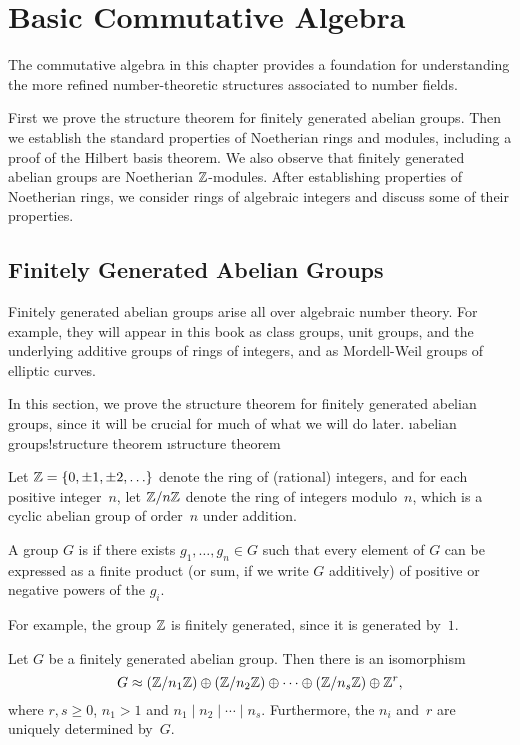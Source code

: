 \chapter{Basic Commutative Algebra}

The commutative algebra in this chapter provides a
foundation for understanding the more refined number-theoretic
structures associated to number fields.

First we prove the structure theorem for finitely generated abelian
groups.  Then we establish the standard properties of Noetherian rings
and modules, including a proof of the Hilbert basis theorem.  We also
observe that finitely generated abelian groups are Noetherian
$\mathbb{Z}$-modules.  After establishing
properties of Noetherian rings, we consider rings of algebraic
integers and discuss some of their properties.

\section{Finitely Generated Abelian Groups}\label{sec:fg}
Finitely generated abelian groups arise all over algebraic number
theory.  For example, they will appear in this book as class groups,
unit groups, and the underlying additive groups of rings of integers,
and as Mordell-Weil groups of elliptic curves.

In this section, we prove the structure theorem for finitely generated
abelian groups, since it will be crucial for much of what we will do
later.  \i{abelian groups!structure theorem} \i{structure theorem}

Let $\mathbb{Z}=\{0,\pm 1, \pm 2, \ldots\}$ denote the ring of (rational)
integers, and for each positive integer~$n$, let $\mathbb{Z}/n\mathbb{Z}$ denote the
ring of integers modulo~$n$, which is a cyclic abelian group of
order~$n$ under addition.

\begin{definition}
  A group $G$ is  if there exists
  $g_1,\ldots, g_n \in G$ such that every element of $G$ can be
  expressed as a finite product (or sum, if we write $G$ additively)
  of positive or negative powers of the $g_i$.
\end{definition}
For example, the group $\mathbb{Z}$ is finitely generated, since it is generated
by~$1$.

\begin{theorem}\label{thm:struc}
Let $G$ be a finitely generated abelian group.  Then there is an isomorphism
$$
  G \approx (\mathbb{Z}/n_1\mathbb{Z}) \oplus (\mathbb{Z}/n_2\mathbb{Z}) \oplus \cdots \oplus
    (\mathbb{Z}/n_s\mathbb{Z}) \oplus \mathbb{Z}^{r},
$$
where $r, s\geq 0$, $n_1>1$ and $n_1\mid{}n_2\mid{}\cdots \mid{}n_s$. 
Furthermore, the $n_i$ and~$r$ are uniquely determined by~$G$.
\end{theorem}


